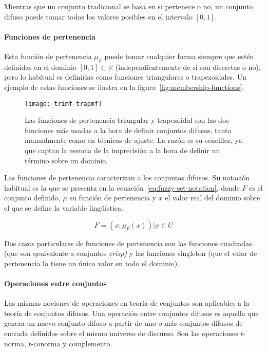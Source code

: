 Mientras que un conjunto tradicional se basa en si pertenece o no, un conjunto difuso puede tomar todos los valores posibles en el intervalo $[0, 1]$.

\paragraph{Funciones de pertenencia}

Esta función de pertenencia $\mu_F$ puede tomar cualquier forma siempre que estén definidas en el dominio $[0, 1] \subset \mathbb{R}$ (independientemente de si son discretas o no), pero lo habitual es definirlas como funciones triangulares o trapezoidales. Un ejemplo de estas funciones se ilustra en la figura~\ref{fig:membership-functions}.

\begin{figure}
	\centering
	\texttt{[image: trimf-trapmf]}
	\caption[Gráfica de funciones de pertenencia triangular y trapezoidal.]{Las funciones de pertenencia triangular y trapezoidal son las dos funciones más usadas a la hora de definir conjuntos difusos, tanto manualmente como en técnicas de ajuste. La razón es su sencillez, ya que captan la esencia de la imprecisión a la hora de definir un término sobre un dominio.}
	\label{fig:trimf-trapmf}
\end{figure}

Las funciones de pertenencia caracterizan a los conjuntos difusos. Su notación habitual es la que se presenta en la ecuación~\ref{eq:fuzzy-set-notation}, donde $F$ es el conjunto definido, $\mu$ su función de pertenencia y $x$ el valor real del dominio sobre el que se define la variable lingüística.

\begin{equation}
	F = {(x, \mu_F(x)) | x \in U}
\end{equation}

Dos casos particulares de funciones de pertenencia son las funciones cuadradas (que son qeuivalente a conjuntos \textit{crisp)} y las funciones singleton (que el valor de pertenencia lo tiene un único valor en todo el dominio).

\paragraph{Operaciones entre conjuntos}

Las mismas nociones de operaciones en teoría de conjuntos son aplicables a la teoría de conjuntos difusos. Una operación entre conjuntos difusos es aquella que genera un nuevo conjunto difuso a partir de uno o más conjuntos difusos de entrada definidos sobre el mismo universo de discurso. Son las operaciones $t$-norma, $t$-conorma y complemento.

